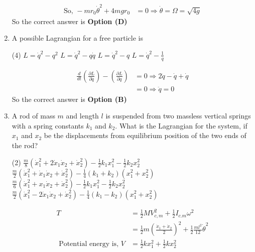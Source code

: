 \begin{enumerate}
\begin{answer}
\begin{align*}
\text{So, }-m r_{0} \dot{\theta}^{2}+4 m g r_{0}&=0 \Rightarrow \dot{\theta}=\Omega=\sqrt{4 g}
\end{align*}
So the correct answer is \textbf{Option (D)}
\end{answer}	
\item A possible Lagrangian for a free particle is
{}
\begin{tasks}(4)
\task[\textbf{A.}] $L=\dot{q}^{2}-q^{2}$
\task[\textbf{B.}] $L=\dot{q}^{2}-q \dot{q}$
\task[\textbf{C.}] $L=\dot{q}^{2}-q$
\task[\textbf{D.}] $L=\dot{q}^{2}-\frac{1}{q}$
\end{tasks}
\begin{answer}
\begin{align*}
\frac{d}{d t}\left(\frac{\partial L}{\partial \dot{q}}\right)-\left(\frac{\partial L}{\partial q}\right)&=0 \Rightarrow 2 \ddot{q}-\dot{q}+\dot{q}\\&=0 \Rightarrow \ddot{q}=0
\end{align*}
So the correct answer is \textbf{Option (B)}
\end{answer}	
\item  A rod of mass $m$ and length $l$ is suspended from two massless vertical springs with a spring constants $k_{1}$ and $k_{2} .$ What is the Lagrangian for the system, if $x_{1}$ and $x_{2}$ be the displacements from equilibrium position of the two ends of the rod?
{}
\begin{tasks}(2)
\task[\textbf{A.}] $\frac{m}{8}\left(\dot{x}_{1}^{2}+2 \dot{x}_{1} \dot{x}_{2}+\dot{x}_{2}^{2}\right)-\frac{1}{2} k_{1} x_{1}^{2}-\frac{1}{2} k_{2} x_{2}^{2}$
\task[\textbf{B.}] $\frac{m}{2}\left(\dot{x}_{1}^{2}+\dot{x}_{1} \dot{x}_{2}+\dot{x}_{2}^{2}\right)-\frac{1}{4}\left(k_{1}+k_{2}\right)\left(x_{1}^{2}+x_{2}^{2}\right)$
\task[\textbf{C.}] $\frac{m}{6}\left(\dot{x}_{1}^{2}+x_{1} \dot{x}_{2}+\dot{x}_{2}^{2}\right)-\frac{1}{2} k_{1} x_{1}^{2}-\frac{1}{2} k_{2} x_{2}^{2}$
\task[\textbf{D.}] $\frac{m}{2}\left(\dot{x}_{1}^{2}-2 \dot{x}_{1} \dot{x}_{2}+\dot{x}_{2}^{2}\right)-\frac{1}{4}\left(k_{1}-k_{2}\right)\left(x_{1}^{2}+x_{2}^{2}\right)$
\end{tasks}
\begin{answer}
\begin{align*}
T&=\frac{1}{2} M V_{c, m}^{2}+\frac{1}{2} I_{c . m} \omega^{2}\\&=\frac{1}{2} m\left(\frac{\dot{x}_{1}+\dot{x}_{2}}{2}\right)^{2}+\frac{1}{2} \frac{m l^{2}}{12} \dot{\theta}^{2}\\
\text{	Potential energy is, }V&=\frac{1}{2} k x_{1}^{2}+\frac{1}{2} k x_{2}^{2}\\

\end{align*}
\end{answer}
\end{enumerate}
